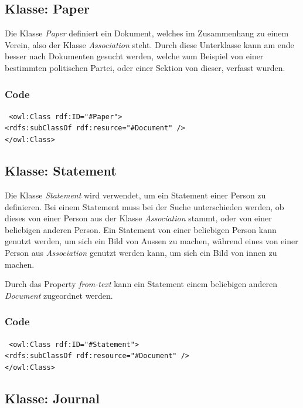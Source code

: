 ﻿\documentclass[
    11pt,
    latin1,
    a4paper,
    oneside
]{scrreprt}
\begin{document}
\subsection{Klasse: Paper} \label{sec:class_paper}

Die Klasse \emph{Paper} definiert ein Dokument, welches im Zusammenhang zu einem Verein, also der Klasse \emph{Association} steht. Durch diese Unterklasse kann am ende besser nach Dokumenten gesucht werden, welche zum Beispiel von einer bestimmten politischen Partei, oder einer Sektion von dieser, verfasst wurden.

\subsubsection{Code}  \label{sec:class_paper_code}

\texttt{ <owl:Class rdf:ID="#Paper"> \\
	<rdfs:subClassOf rdf:resurce="#Document" /> \\
</owl:Class> }


\subsection{Klasse: Statement} \label{sec:class_statement}

Die Klasse \emph{Statement} wird verwendet, um ein Statement einer Person zu definieren. Bei einem Statement muss bei der Suche unterschieden werden, ob dieses von einer Person aus der Klasse \emph{Association} stammt, oder von einer beliebigen anderen Person. Ein Statement von einer beliebigen Person kann genutzt werden, um sich ein Bild von Aussen zu machen, w\"ahrend eines von einer Person aus \emph{Association} genutzt werden kann, um sich ein Bild von innen zu machen.

Durch das Property \emph{from-text} kann ein Statement einem beliebigen anderen \emph{Document} zugeordnet werden.

\subsubsection{Code} \label{sec:class_statement_code}

\texttt{ <owl:Class rdf:ID="#Statement"> \\
    <rdfs:subClassOf rdf:resource="#Document" /> \\
</owl:Class> }


\subsection{Klasse: Journal} \label{sec:class_journal}
\end{document}
